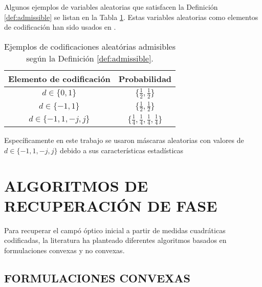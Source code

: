 Algunos ejemplos de variables aleatorias que satisfacen la Definición \ref{def:admissible} se listan en la Tabla \ref{tab:admi_examples}. Estas variables aleatorias como elementos de codificación han sido usados en .

\begin{table}[!h]
\centering
\begin{tabular}{|c|c|}
\hline
\textbf{Elemento de codificación} & \textbf{Probabilidad}                     \\ \hline
$d \in \{0, 1\}$         & $\{ \frac{1}{2},  \frac{1}{2}\}$ \\ \hline
$d \in \{-1, 1\}$        & $\{ \frac{1}{2},  \frac{1}{2}\}$ \\ \hline
$d \in \{-1, 1, -j,  j\}$ & $\{ \frac{1}{4},  \frac{1}{4}, \frac{1}{4},  \frac{1}{4}\}$ \\ \hline
\end{tabular}
\caption{Ejemplos de codificaciones aleatórias admisibles según la Definición \ref{def:admissible}.}
\label{tab:admi_examples}
\end{table}

Específicamente en este trabajo se usaron máscaras aleatorias con valores de $d \in \{-1, 1, -j,  j\}$ debido a sus características estadísticas 



\chapter{ALGORITMOS DE RECUPERACIÓN DE FASE}
Para recuperar el campó óptico inicial a partir de medidas cuadráticas codificadas, la literatura ha planteado diferentes algoritmos basados en formulaciones convexas y no convexas.

\section{FORMULACIONES CONVEXAS}

